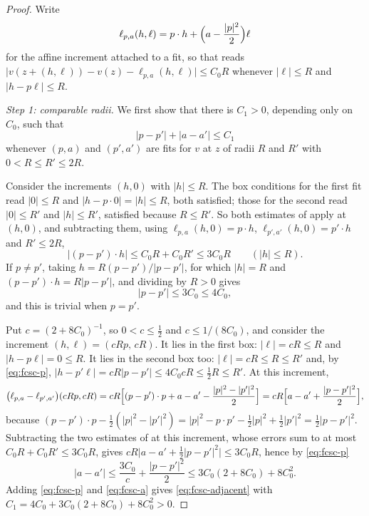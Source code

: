 \begin{proof}
Write
\[
  \ell_{p,a}(h,\ell)=p\cdot h+\Bigl(a-\frac{|p|^2}{2}\Bigr)\ell
\]
for the affine increment attached to a fit, so that  reads
$\bigl|v(z+(h,\ell))-v(z)-\ell_{p,a}(h,\ell)\bigr|\le C_0R$ whenever
$|\ell|\le R$ and $|h-p\ell|\le R$.

\emph{Step 1: comparable radii.}
We first show that there is $C_1>0$, depending only on $C_0$, such that
\begin{equation}\label{eq:fcsc-adjacent}
  |p-p'|+|a-a'|\le C_1
\end{equation}
whenever $(p,a)$ and $(p',a')$ are fits for $v$ at $z$ of radii $R$ and $R'$
with $0<R\le R'\le2R$.

Consider the increments $(h,0)$ with $|h|\le R$. The box conditions for the
first fit read $|0|\le R$ and $|h-p\cdot0|=|h|\le R$, both satisfied; those for
the second read $|0|\le R'$ and $|h|\le R'$, satisfied because $R\le R'$. So
both estimates of  apply at $(h,0)$, and subtracting them, using
$\ell_{p,a}(h,0)=p\cdot h$, $\ell_{p',a'}(h,0)=p'\cdot h$ and $R'\le2R$,
\[
  |(p-p')\cdot h|\le C_0R+C_0R'\le3C_0R\qquad(|h|\le R).
\]
If $p\ne p'$, taking $h=R(p-p')/|p-p'|$, for which $|h|=R$ and
$(p-p')\cdot h=R|p-p'|$, and dividing by $R>0$ gives
\begin{equation}\label{eq:fcsc-p}
  |p-p'|\le3C_0\le4C_0 ,
\end{equation}
and this is trivial when $p=p'$.

Put $c=(2+8C_0)^{-1}$, so $0<c\le\tfrac12$ and $c\le1/(8C_0)$, and consider the
increment $(h,\ell)=(cRp,\,cR)$. It lies in the first box: $|\ell|=cR\le R$ and
$|h-p\ell|=0\le R$. It lies in the second box too: $|\ell|=cR\le R\le R'$ and,
by \eqref{eq:fcsc-p}, $|h-p'\ell|=cR|p-p'|\le4C_0cR\le\tfrac12R\le R'$. At this
increment,
\[
  \bigl(\ell_{p,a}-\ell_{p',a'}\bigr)(cRp,cR)
   =cR\Bigl[(p-p')\cdot p+a-a'-\frac{|p|^2-|p'|^2}{2}\Bigr]
   =cR\Bigl[a-a'+\frac{|p-p'|^2}{2}\Bigr],
\]
because
$(p-p')\cdot p-\tfrac12(|p|^2-|p'|^2)
 =|p|^2-p\cdot p'-\tfrac12|p|^2+\tfrac12|p'|^2=\tfrac12|p-p'|^2$. Subtracting
the two estimates of  at this increment, whose errors sum to at
most $C_0R+C_0R'\le3C_0R$, gives
$cR\bigl|a-a'+\tfrac12|p-p'|^2\bigr|\le3C_0R$, hence by \eqref{eq:fcsc-p}
\begin{equation}\label{eq:fcsc-a}
  |a-a'|\le\frac{3C_0}{c}+\frac{|p-p'|^2}{2}
   \le3C_0(2+8C_0)+8C_0^2 .
\end{equation}
Adding \eqref{eq:fcsc-p} and \eqref{eq:fcsc-a} gives
\eqref{eq:fcsc-adjacent} with
$C_1=4C_0+3C_0(2+8C_0)+8C_0^2>0$.


\end{proof}
